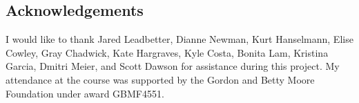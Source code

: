 \documentclass{article}
\begin{document}
\subsection*{Acknowledgements}

I would like to thank Jared Leadbetter, Dianne Newman, Kurt Hanselmann,
Elise Cowley, Gray Chadwick, Kate Hargraves, Kyle Costa, Bonita Lam,
Kristina Garcia, Dmitri Meier, and Scott Dawson for assistance during
this project.  My attendance at the course was supported by the Gordon
and Betty Moore Foundation under award GBMF4551.



\end{document}
